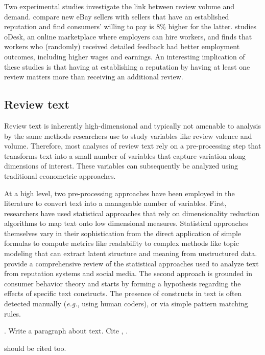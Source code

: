\documentclass[letter,12pt]{article}
\begin{document}
Two experimental studies investigate the link between review volume and
demand. \citet{resnick2006value} compare new eBay sellers with sellers that
have an established reputation and find consumers' willing to pay is 8\%
higher for the latter. \citet{pallais2014inefficient} studies oDesk, an online
marketplace where employers can hire workers, and finds that workers who
(randomly) received detailed feedback had better employment outcomes,
including higher wages and earnings. An interesting implication of these
studies is that having at establishing a reputation by having at least one
review matters more than receiving an additional review.

\subsection{Review text}

Review text is inherently high-dimensional and typically not amenable to
analysis by the same methods researchers use to study variables like review
valence and volume. Therefore, most analyses of review text rely on a
pre-processing step that transforms text into a small number of variables that
capture variation along dimensions of interest. These variables can
subsequently be analyzed using traditional econometric approaches.

At a high level, two pre-processing approaches have been employed in the
literature to convert text into a manageable number of variables. First,
researchers have used statistical approaches that rely on dimensionality
reduction algorithms to map text onto low dimensional measures. Statistical
approaches themselves vary in their sophistication from the direct application
of simple formulas to compute metrics like readability to complex methods like
topic modeling that can extract latent structure and meaning from unstructured
data. \citet{moe2017social} provide a comprehensive review of the statistical
approaches used to analyze text from reputation systems and social media. The
second approach is grounded in consumer behavior theory and starts by forming
a hypothesis regarding the effects of specific text constructs. The presence
of constructs in text is often detected manually (\emph{e.g.}, using human
coders), or via simple pattern matching rules.

\citet{buschken2016sentence}. 
Write a paragraph about text. Cite \citet{ghose2012designing},
\citet{packard2017language}.

\citet{ghose2011estimating} should be cited too.
\end{document}
